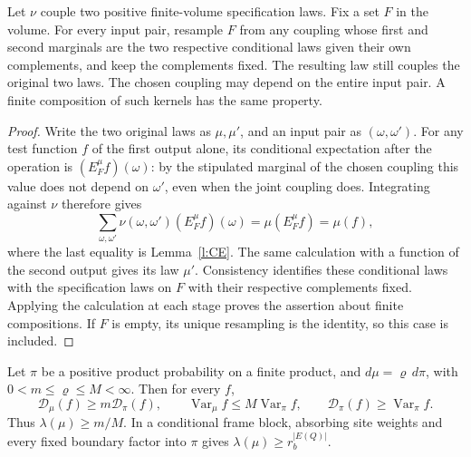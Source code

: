 \begin{lemma}\label{l:surgery}
Let \(\nu\) couple two positive finite-volume specification laws.
Fix a set \(F\) in the volume. For every input pair, resample \(F\)
from any coupling whose first and second marginals are the two
respective conditional laws given their own complements, and keep
the complements fixed. The resulting law still couples the original
two laws. The chosen coupling may depend on the entire input pair.
A finite composition of such kernels has the same property.
\end{lemma}

\begin{proof}
Write the two original laws as \(\mu,\mu'\), and an input pair as
\((\omega,\omega')\).  For any test function \(f\) of the first
output alone, its conditional expectation after the operation is
\((E_F^\mu f)(\omega)\): by the stipulated marginal of the chosen
coupling this value does not depend on \(\omega'\), even when the
joint coupling does.  Integrating against \(\nu\) therefore gives
\[
 \sum_{\omega,\omega'}\nu(\omega,\omega')
                  (E_F^\mu f)(\omega)
       =\mu(E_F^\mu f)=\mu(f),
\]
where the last equality is Lemma~\ref{l:CE}.  The same calculation
with a function of the second output gives its law \(\mu'\).
Consistency identifies these conditional laws with the specification
laws on \(F\) with their respective complements fixed.  Applying the
calculation at each stage proves the assertion about finite compositions.
If \(F\) is empty, its unique resampling is the identity, so this case
is included.
\end{proof}

\begin{lemma}\label{l:density}
Let \(\pi\) be a positive product probability on a finite product,
and \(d\mu=\varrho\,d\pi\), with \(0<m\le\varrho\le M<\infty\).
Then for every \(f\),
\[
 \mathcal D_\mu(f)\ge m\mathcal D_\pi(f),\qquad
 \operatorname{Var}_\mu f\le M\operatorname{Var}_\pi f,\qquad
 \mathcal D_\pi(f)\ge\operatorname{Var}_\pi f .
\]
Thus \(\lambda(\mu)\ge m/M\).
In a conditional frame block, absorbing site weights and every
fixed boundary factor into \(\pi\) gives
\(\lambda(\mu)\ge r_b^{|E(Q)|}\).
\end{lemma}

